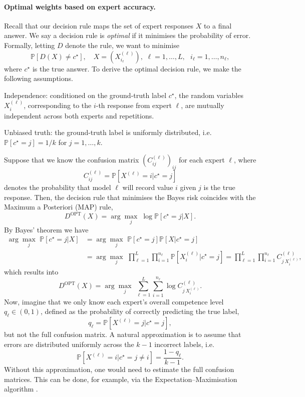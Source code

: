 \paragraph{Optimal weights based on expert accuracy.}
Recall that our decision rule maps the set of expert responses $X$ to a final answer. We say a decision rule is \emph{optimal} if it minimises the probability of error. Formally, letting $D$ denote the rule, we want to minimise
$$
\mathbb{P}\left[D(X)\neq c^\star\right], \quad X = (X_{i_\ell}^{(\ell)}),\,\, \ell = 1,\dots, L,\,\,\,\, i_\ell = 1,\dots,n_\ell,
$$
where $c^\star$ is the true answer.
To derive the optimal decision rule, we make the following assumptions.
\begin{assumption}\label{assumption:independence_between_draws}
    Independence: conditioned on the ground-truth label $c^\star$, the random variables $X_i^{(\ell)}$, corresponding to the $i$-th response from expert $\ell$, are mutually independent across both experts and repetitions.
\end{assumption}
\begin{assumption}\label{assumption:unbiased_truth}
    Unbiased truth: the ground-truth label is uniformly distributed, i.e. $\mathbb{P}[c^\star=j] = 1/k$ for $j=1, \dots, k$.
\end{assumption}

Suppose that we know the confusion matrix $\left(C_{ij}^{(\ell)}\right)_{ij}$ for each expert $\ell$, where $$C_{ij}^{(\ell)} = \mathbb{P}\left[X^{(\ell)} = i\big \vert c^\star=j\right]$$ denotes the probability that model $\ell$ will record value $i$ given $j$ is the true response. 
Then, the decision rule that minimises the Bayes risk coincides with the Maximum a Posteriori (MAP) rule,
$$
D^{\text{OPT}}(X)=\arg\max_j\; \log \mathbb{P}[c^\star=j\vert X].
$$
By Bayes' theorem we have
\begin{align*}
  \arg\max_j \,\,\mathbb{P}[c^\star=j\vert X] &= \arg\max_j \,\,\mathbb{P}[c^\star=j] \mathbb{P}[X\vert c^\star=j]\\
  &= \arg\max_j \,\, \prod_{\ell=1}^L \prod_{i=1}^{n_\ell}\mathbb{P}\left[X_i^{(\ell)}\big \vert c^\star=j\right] = \prod_{\ell=1}^L \prod_{i=1}^{n_\ell} C_{j\ X_i^{(\ell)}}^{(\ell)},  
\end{align*}
which results into
$$
D^{\text{OPT}}(X)=\arg\max_j\; \sum_{\ell=1}^L \sum_{i=1}^{n_\ell}\log C_{j\ X_i^{(\ell)}}^{(\ell)}.
$$
Now, imagine that we only know each expert’s overall competence level $q_\ell \in (0,1)$, defined as the probability of correctly predicting the true label,
$$q_\ell = \mathbb{P}\left[X^{(\ell)}= j\big\vert c^\star=j\right],$$
but not the full confusion matrix.
A natural approximation is to assume that errors are distributed uniformly across the $k-1$ incorrect labels, i.e.
$$\mathbb{P}[X^{(\ell)}= i\big\vert c^\star= j\neq i] = \frac{1-q_\ell}{k-1}.$$
Without this approximation, one would need to estimate the full confusion matrices. This can be done, for example, via the Expectation–Maximisation algorithm \citep{dawid_skene_79}.




